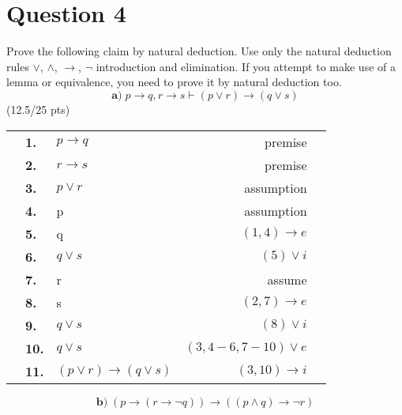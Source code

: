 \documentclass[a4paper,12pt]{article}
\newcommand\tab[1][1cm]{\hspace*{#1}}
\begin{document}
\section*{Question 4 \hfill {}}
\tab Prove the following claim by natural deduction. Use only the natural deduction rules $\vee$, $\wedge$, $\rightarrow$, $\neg$ introduction and elimination. If you attempt to make use of a lemma or equivalence, you need to prove it by natural deduction too.
\begin{equation*}
    \textbf{a)} \; p \rightarrow q, r \rightarrow s \vdash (p \vee r) \rightarrow (q \vee s)
\end{equation*}
\hfill \small{(12.5/25 pts)}\\
\begin{tcolorbox}
\begin{tabular}{|l|llr|l|}
\multicolumn{1}{l}{}  & \textbf{1.}  & $p\rightarrow q$                     & \multicolumn{1}{r}{premise}                   & \multicolumn{1}{l}{}  \\
\multicolumn{1}{l}{}  & \textbf{2.}  & $r\rightarrow s$                     & \multicolumn{1}{r}{premise}                   & \multicolumn{1}{l}{}  \\ 
\hline
\multicolumn{1}{|l}{} & \textbf{3.}  & $p \vee r$                           & \multicolumn{1}{r}{assumption}                &                       \\ 
\cline{2-4}
                      & \textbf{4.}  & p                                    & assumption                                    &                       \\
                      & \textbf{5.}  & q                                    & $(1, 4) \rightarrow e $                       &                       \\
                      & \textbf{6.}  & $q \vee s$                           & $(5) \vee i$                                  &                       \\ 
\cline{2-4}
                      & \textbf{7.}  & r                                    & assume                                        &                       \\
                      & \textbf{8.}  & s                                    & $(2, 7) \rightarrow e$                        &                       \\
                      & \textbf{9.}  & $q \vee s$                           & $(8) \vee i $                                 &                       \\ 
\cline{2-4}
\multicolumn{1}{|l}{} & \textbf{10.} & $q \vee s$                           & \multicolumn{1}{r}{$(3, 4-6, 7-10) \vee e $ } &                       \\ 
\hline
\multicolumn{1}{l}{}  & \textbf{11.} & $(p \vee r) \rightarrow (q \vee s)$  & \multicolumn{1}{r}{$(3, 10) \rightarrow i$ }  & \multicolumn{1}{l}{} 
\end{tabular}
\end{tcolorbox}
\begin{equation*}
     \textbf{b)} \;  (p \rightarrow (r \rightarrow \neg q)) \rightarrow ((p \wedge q) \rightarrow \neg r)
\end{equation*}
\end{document}
